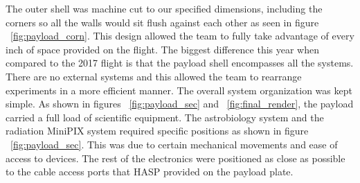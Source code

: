 The outer shell was machine cut to our specified dimensions, including the corners so all the walls would sit flush against each other as seen in figure ~\ref{fig:payload_corn}.  This design allowed the team to fully take advantage of every inch of space provided on the flight.  The biggest difference this year when compared to the 2017 flight is that the payload shell encompasses all the systems.  There are no external systems and this allowed the team to rearrange experiments in a more efficient manner.
The overall system organization was kept simple.  As shown in figures ~\ref{fig:payload_sec} and ~\ref{fig:final_render}, the payload carried a full load of scientific equipment.  The astrobiology system and the radiation MiniPIX system required specific positions as shown in figure ~\ref{fig:payload_sec}.  This was due to certain mechanical movements and ease of access to devices.  The rest of the electronics were positioned as close as possible to the cable access ports that HASP provided on the payload plate.

